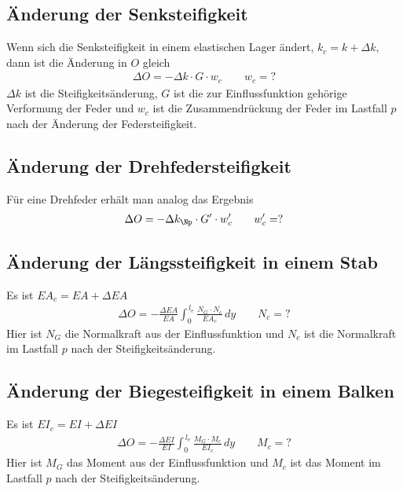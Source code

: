 {{{{{{%
\textcolor{blau2}{\subsection{\"{A}nderung der Senksteifigkeit}}
Wenn sich die Senksteifigkeit  in einem elastischen Lager \"{a}ndert, $k_c = k + \Delta k$, dann ist die \"{A}nderung in $O$ gleich
\begin{align}
\Delta O = - \Delta k \cdot G \cdot w_c \qquad w_c = ?
\end{align}
$\Delta k$ ist die Steifigkeits\"{a}nderung, $G$ ist die zur  Einflussfunktion geh\"{o}rige Verformung der Feder und $w_c$ ist die Zusammendr\"{u}ckung der Feder im Lastfall $p$ nach der \"{A}nderung der Federsteifigkeit.

\textcolor{blau2}{\subsection{\"{A}nderung der Drehfedersteifigkeit }}
F\"{u}r eine Drehfeder erh\"{a}lt man analog das Ergebnis
\begin{align}
\Delta O = -\Delta k_\Np \cdot G' \cdot w_c' \qquad w_c' = ?
\end{align}

\textcolor{blau2}{\subsection{\"{A}nderung der L\"{a}ngssteifigkeit in einem Stab}}
Es ist $EA_c = EA + \Delta EA$
\begin{align}
\Delta O = - \frac{\Delta EA}{EA} \int_0^{\,l_e} \frac{N_G \cdot N_c}{EA_c}\,dy \qquad N_c = ?
\end{align}
Hier ist $N_G$ die Normalkraft aus der Einflussfunktion und $N_c$ ist die Normalkraft im Lastfall $p$ nach der Steifigkeits\"{a}nderung.

\textcolor{blau2}{\subsection{\"{A}nderung der Biegesteifigkeit in einem Balken}}
Es ist $EI_c = EI + \Delta EI$
\begin{align}
\Delta O = - \frac{\Delta EI}{EI} \int_0^{\,l_e} \frac{M_G \cdot M_c}{EI_c}\,dy \qquad M_c = ?
\end{align}
Hier ist $M_G$ das Moment aus der Einflussfunktion und $M_c$ ist das Moment im Lastfall $p$ nach der Steifigkeits\"{a}nderung.

}}}}}}
